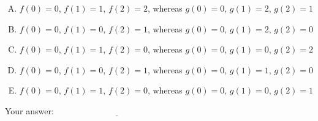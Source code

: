 \documentclass[10pt]{amsart}
\begin{document}
\begin{enumerate}
  \begin{enumerate}[(A)]
  \item $f(0) = 0$, $f(1) = 1$, $f(2) = 2$, whereas $g(0) = 0$, $g(1)
    = 2$, $g(2) = 1$
  \item $f(0) = 0$, $f(1) = 0$, $f(2) = 1$, whereas $g(0) = 0$, $g(1)
    = 2$, $g(2) = 0$
  \item $f(0) = 0$, $f(1) = 1$, $f(2) = 0$, whereas $g(0) = 0$, $g(1)
    = 0$, $g(2) = 2$
  \item $f(0) = 0$, $f(1) = 0$, $f(2) = 1$, whereas $g(0) = 0$, $g(1)
    = 1$, $g(2) = 0$
  \item $f(0) = 0$, $f(1) = 1$, $f(2) = 0$, whereas $g(0) = 0$, $g(1)
    = 0$, $g(2) = 1$
  \end{enumerate}

  \vspace{0.1in}
  Your answer: $\underline{\qquad\qquad\qquad\qquad\qquad\qquad\qquad}$
  \vspace{0.1in}

\end{enumerate}
\end{document}
